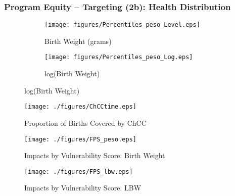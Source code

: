 \documentclass[10pt,letterpaper,subeqn,table]{beamer}
\begin{document}
\begin{frame}[label=equity2]
\frametitle{Program Equity -- Targeting (2b): Health Distribution}
\begin{figure}[htpb!]
  \begin{center}
    \caption{Policy Impact by Percentile}
    \label{quintiles}
    \begin{subfigure}{.5\textwidth}
      \centering
      \texttt{[image: figures/Percentiles\_peso\_Level.eps]}
      \caption{Birth Weight (grams)}
      \label{quintiles-level}
    \end{subfigure}%
    \begin{subfigure}{.5\textwidth}
      \centering
      \texttt{[image: figures/Percentiles\_peso\_Log.eps]}
      \caption{log(Birth Weight)}
      \label{quintiles-log}
    \end{subfigure}
  \end{center}
\end{figure}
\footnotesize{\hyperlink{equity}{}}
\end{frame}

\begin{frame}[label=coverProp]
\begin{figure}[htpb!]
  \begin{center}
  \centering
  \caption{Proportion of Births Covered by ChCC}
  \texttt{[image: ./figures/ChCCtime.eps]}
\end{center}
\end{figure}
\footnotesize{\hyperlink{efficiency}{}}
\end{frame}


\begin{frame}[label=FSPapp]
\begin{figure}[htpb!]
  \begin{center}
  \centering
  \caption{Impacts by Vulnerability Score: Birth Weight}
  \texttt{[image: ./figures/FPS\_peso.eps]}
\end{center}
\end{figure}
\footnotesize{\hyperlink{FSP}{}}
\end{frame}

\begin{frame}
\begin{figure}[htpb!]
  \begin{center}
  \centering
  \caption{Impacts by Vulnerability Score: LBW}
  \texttt{[image: ./figures/FPS\_lbw.eps]}
\end{center}
\end{figure}
\footnotesize{\hyperlink{FSP}{}}
\end{frame}
\end{document}
